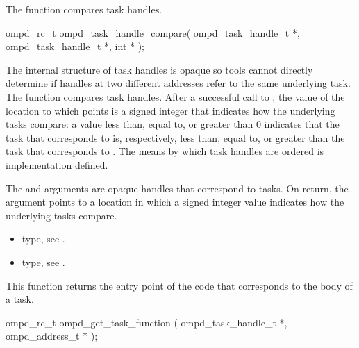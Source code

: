 \label{subsubsubsec:ompd_task_handle_compare}
\summary
The  function compares task handles.

\format
\begin{cspecific}
\begin{ompSyntax}
ompd_rc_t ompd_task_handle_compare(
  ompd_task_handle_t *,
  ompd_task_handle_t *,
  int *
);
\end{ompSyntax}
\end{cspecific}


\descr
The internal structure of task handles is opaque so tools  cannot directly
determine if handles at two different addresses refer to the same underlying 
task. The  function compares task handles.
After a successful call to , the value of 
the location to which  points is a signed integer that 
indicates how the underlying tasks compare: a value less than, equal to, 
or greater than 0 indicates that the task that corresponds to  
is, respectively, less than, equal to, or greater than the task that 
corresponds to . The means by which task handles are 
ordered is implementation defined.

\argdesc
The  and  arguments are opaque handles
that correspond to tasks. On return, the  argument points to
a location in which a signed integer value indicates how the underlying tasks 
compare.

\crossreferences
\begin{itemize}
\item {} type, see .

\item {} type, see .
\end{itemize}



\label{subsubsubsec:ompd_get_task_function}

\summary
This  function returns the entry point of 
the code that corresponds to the body of a task.

\format
\begin{cspecific}
\begin{ompSyntax}
ompd_rc_t ompd_get_task_function (
  ompd_task_handle_t *,
  ompd_address_t *
);
\end{ompSyntax}
\end{cspecific}

